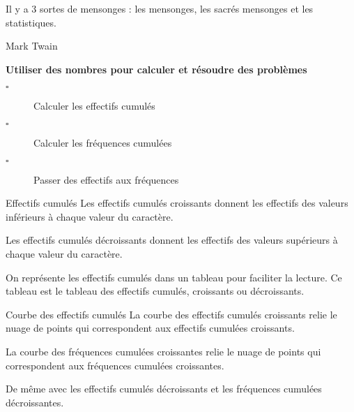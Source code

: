 \begin{titre}

\end{titre}

Il y a 3 sortes de mensonges : les mensonges, les sacrés mensonges et les statistiques.

\hfill{Mark Twain}

\begin{CpsCol}
\textbf{Utiliser des nombres pour calculer et résoudre des problèmes}
\begin{description}
\item[$\square$] Calculer les effectifs cumulés
\item[$\square$] Calculer les fréquences cumulées
\item[$\square$] Passer des effectifs aux fréquences
\end{description}
\end{CpsCol}



\begin{DefT}{Effectifs cumulés}
Les effectifs cumulés croissants donnent les effectifs des valeurs inférieurs à chaque valeur du caractère.

Les effectifs cumulés décroissants donnent les effectifs des valeurs supérieurs à chaque valeur du caractère.
\end{DefT}

\begin{Rq}
On représente les effectifs cumulés dans un tableau pour faciliter la lecture. Ce tableau est le tableau des effectifs cumulés, croissants ou décroissants.
\end{Rq}

\begin{DefT}{Courbe des effectifs cumulés}
La courbe des effectifs cumulés croissants relie le nuage de points qui correspondent aux effectifs cumulées croissants.

La courbe des fréquences cumulées croissantes relie le nuage de points qui correspondent aux fréquences cumulées croissantes.

De même avec les effectifs cumulés décroissants et les fréquences cumulées décroissantes.
\end{DefT}












